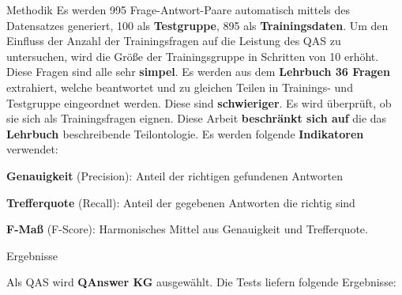 \documentclass[portrait,final,a0paper,fontscale=0.320]{imiseposter}
\begin{document}
\begin{poster}
\begin{posterbox}[name=methods,below=background]{Methodik}
Es werden 995 Frage-Antwort-Paare automatisch mittels des Datensatzes generiert, 100 als \textbf{Testgruppe}, 895 als \textbf{Trainingsdaten}.
Um den Einfluss der Anzahl der Trainingsfragen auf die Leistung des QAS zu untersuchen, wird die Größe der Trainingsgruppe in Schritten von 10 erhöht.
Diese Fragen sind alle sehr \textbf{simpel}.
Es werden aus dem \textbf{Lehrbuch \cite{bb} 36 Fragen} extrahiert, welche beantwortet und zu gleichen Teilen in Trainings- und Testgruppe eingeordnet werden.
Diese sind \textbf{schwieriger}.
Es wird überprüft, ob sie sich als Trainingsfragen eignen.
Diese Arbeit \textbf{beschränkt sich auf} die das \textbf{Lehrbuch \cite{bb}} beschreibende Teilontologie.
Es werden folgende \textbf{Indikatoren} verwendet:

\textbf{Genauigkeit} (Precision): Anteil der richtigen gefundenen Antworten

\textbf{Trefferquote} (Recall): Anteil der gegebenen Antworten die richtig sind

\textbf{F-Maß} (F-Score): Harmonisches Mittel aus Genauigkeit und Trefferquote.
\end{posterbox}
\begin{posterbox}[name=results,column=1]{Ergebnisse}

Als QAS wird \textbf{QAnswer KG} \cite{qanswer} ausgewählt.
Die Tests liefern folgende Ergebnisse:


\end{posterbox}
\end{poster}
\end{document}
